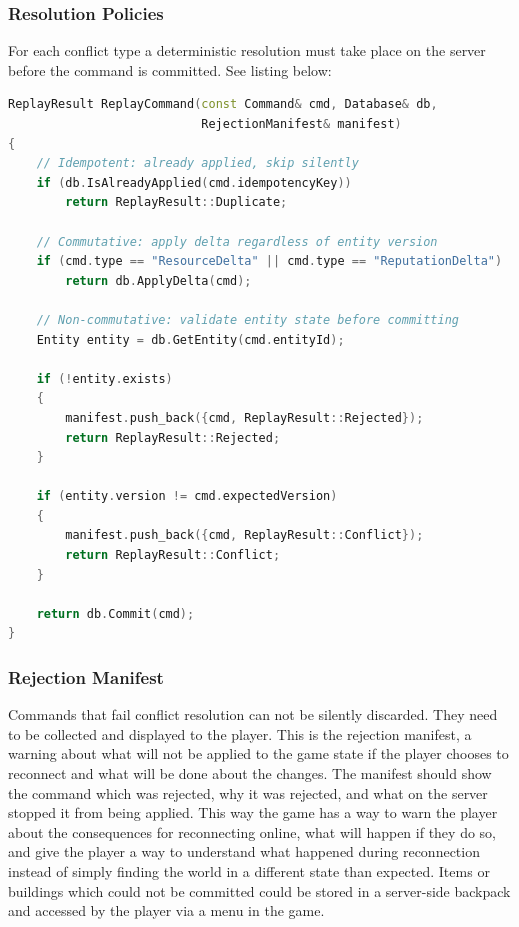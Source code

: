 \documentclass{article}
\begin{document}
\subsubsection{Resolution Policies}

For each conflict type a deterministic resolution must take place on the server before the command is committed. See listing below:

\newpage

\begin{lstlisting}[language=C++, basicstyle=\tiny, caption={Server-side command validation and conflict resolution}]
ReplayResult ReplayCommand(const Command& cmd, Database& db,
                           RejectionManifest& manifest)
{
    // Idempotent: already applied, skip silently
    if (db.IsAlreadyApplied(cmd.idempotencyKey))
        return ReplayResult::Duplicate;

    // Commutative: apply delta regardless of entity version
    if (cmd.type == "ResourceDelta" || cmd.type == "ReputationDelta")
        return db.ApplyDelta(cmd);

    // Non-commutative: validate entity state before committing
    Entity entity = db.GetEntity(cmd.entityId);

    if (!entity.exists)
    {
        manifest.push_back({cmd, ReplayResult::Rejected});
        return ReplayResult::Rejected;
    }

    if (entity.version != cmd.expectedVersion)
    {
        manifest.push_back({cmd, ReplayResult::Conflict});
        return ReplayResult::Conflict;
    }

    return db.Commit(cmd);
}
\end{lstlisting}

\subsubsection{Rejection Manifest}

Commands that fail conflict resolution can not be silently discarded. They need to be collected and displayed to the player. This is the rejection manifest, a warning about what will not be applied to the game state if the player chooses to reconnect and what will be done about the changes. The manifest should show the command which was rejected, why it was rejected, and what on the server stopped it from being applied. This way the game has a way to warn the player about the consequences for reconnecting online, what will happen if they do so, and give the player a way to understand what happened during reconnection instead of simply finding the world in a different state than expected. Items or buildings which could not be committed could be stored in a server-side backpack and accessed by the player via a menu in the game.
\end{document}
